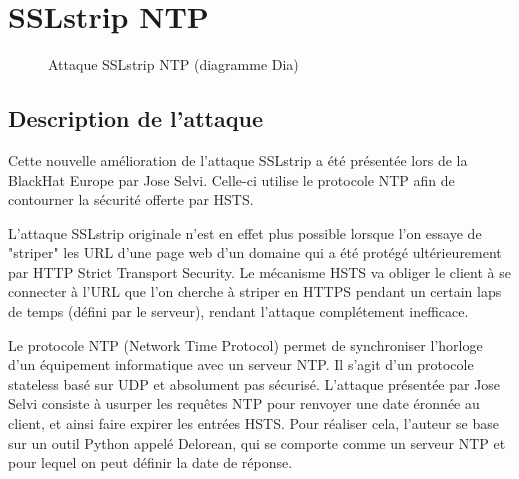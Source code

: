 \chapter{SSLstrip NTP}

\label{sec:sslstrip-ntp}

\begin{figure}[H]
  \caption{Attaque SSLstrip NTP (diagramme Dia)}
\end{figure}

\section{Description de l'attaque}

Cette nouvelle amélioration de l'attaque SSLstrip a été présentée lors de la BlackHat Europe par Jose Selvi. Celle-ci utilise le protocole NTP afin de contourner la sécurité offerte par HSTS.

L'attaque SSLstrip originale n'est en effet plus possible lorsque l'on essaye de "striper" les URL d'une page web d'un domaine qui a été protégé ultérieurement par HTTP Strict Transport Security. Le mécanisme HSTS va obliger le client à se connecter à l'URL que l'on cherche à striper en HTTPS pendant un certain laps de temps (défini par le serveur), rendant l'attaque complétement inefficace.

Le protocole NTP (Network Time Protocol) permet de synchroniser l'horloge d'un équipement informatique avec un serveur NTP. Il s'agit d'un protocole stateless basé sur UDP et absolument pas sécurisé. L'attaque présentée par Jose Selvi consiste à usurper les requêtes NTP pour renvoyer une date éronnée au client, et ainsi faire expirer les entrées HSTS. Pour réaliser cela, l'auteur se base sur un outil Python appelé Delorean, qui se comporte comme un serveur NTP et pour lequel on peut définir la date de réponse.

